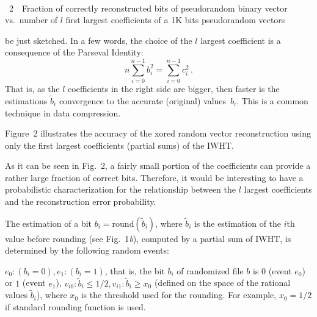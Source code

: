 \begin{multicols}{2}
{}

\vspace*{4pt}

\addtocounter{table}{1}

\begin{center}  %
  \mbox{%
 \epsfxsize=77.744mm
 }
 \end{center}
 \vspace*{-4pt}
{{\figurename~2}\ \ \small{Fraction of correctly reconstructed bits of pseudorandom binary vector vs.\ 
  number of $l$ first largest coefficients  of a 1K bits pseudorandom vectors}}




\vspace*{12pt}

\addtocounter{figure}{1}





\noindent
 be just sketched. In a few words, the choice of the $l$ largest 
coefficient is a consequence of the Parseval Identity:
$$ n\sum\limits_{i=0}^{n-1} b_i^2 =\sum\limits_{i=0}^{n-1} c_i ^2\,.
$$
 That is, as the $l$ coefficients in the right side are bigger, then faster is 
 the estimations $\tilde b_i$ convergence to the accurate (original) values~$b_i$.
 This is a common technique in data compression.

Figure~2 illustrates the accuracy of the xored random vector reconstruction using 
only the first largest coefficients (partial sums) of the IWHT.


As it can be seen in Fig.~2, a fairly small portion of the coefficients 
can provide a rather large fraction of correct bits.
Therefore, it would be interesting to have a probabilistic 
characterization for the relationship between the $l$ largest 
coefficients and the reconstruction error probability.


The  estimation of a bit $b_i = \mathrm{round}\left(\tilde b_i\right)$,
where $\tilde b_i$ is the estimation of the $i$th value before
rounding (see Fig.~1\textit{b}), computed by a partial sum of IWHT, is determined
by the following random events:

$e_0:( b_i =0), e_1:( b_i =1)$, that is, the bit $b_i$ of
randomized file $b$ is $0$ (event $e_0$) or $1$ (event $e_1$), $
v_{i0}: {\tilde b_i \le 1/2}, v_{i1}:{\tilde b_i \ge x_0}$
(defined on the space of the rational values  $\tilde b_i$), 
where $x_0$ is the threshold used for the rounding. For example, 
$x_0=1/2$ if  standard rounding function is used.


\end{multicols}

